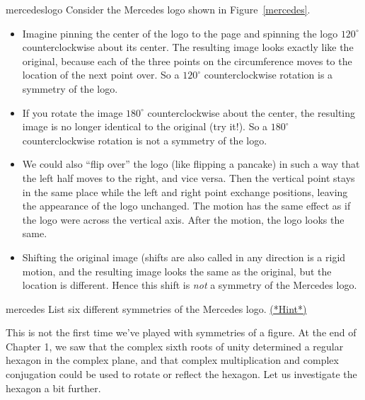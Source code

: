 \begin{example}{mercedeslogo} Consider the Mercedes logo shown in Figure~\ref{mercedes}.
\begin{itemize}
\item
Imagine pinning the center of the logo to the page and spinning the logo $120^\circ$ counterclockwise about its center. The resulting image looks exactly like the original, because each of the three points on the circumference moves  to the location of the next point over. So a $120^\circ$ counterclockwise rotation is a symmetry of the logo. 
\item
If you rotate the image $180^\circ$ counterclockwise about the center, the resulting image is no longer identical to the original (try it!).  So a $180^\circ$ counterclockwise rotation is not a symmetry of the logo.  
\item
We could also ``flip over'' the logo (like flipping a pancake) in such a way that the left half moves to the right, and vice versa.  Then the vertical point stays in the same place while the left and right point exchange positions, leaving the appearance of the logo unchanged. The motion has the same effect as if the logo were  across the vertical axis. After the motion, the logo looks the same. 
\item
Shifting  the original image (shifts are also called  in any direction is a rigid motion, and  the resulting image looks the same as the original, but the location is different.  Hence this shift is \emph{not} a symmetry of the Mercedes logo.
\end{itemize}
\end{example}

\begin{exercise}{mercedes}
List six different symmetries of the Mercedes logo.
\hyperref[sec:symmetries:hints]{(*Hint*)}
\end{exercise}

This is not the first time we've played with symmetries of a figure.  At the end of Chapter 1, we saw that the complex sixth roots of unity determined a regular hexagon in the complex plane, and that complex multiplication and complex conjugation could be used to rotate or reflect the hexagon. 
Let us investigate the hexagon a bit further.

